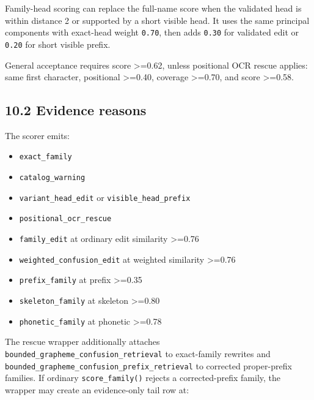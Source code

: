 Family-head scoring can replace the full-name score when the validated head is within distance 2 or supported by a short visible head. It uses the same principal components with exact-head weight \texttt{0.70}, then adds \texttt{0.30} for validated edit or \texttt{0.20} for short visible prefix.

General acceptance requires score \textgreater=0.62, unless positional OCR rescue applies: same first character, positional \textgreater=0.40, coverage \textgreater=0.70, and score \textgreater=0.58.

\subsection{10.2 Evidence reasons}\label{102-evidence-reasons}

The scorer emits:

\begin{itemize}
\tightlist
\item
  \texttt{exact\_\allowbreak{}family}
\item
  \texttt{catalog\_\allowbreak{}warning}
\item
  \texttt{variant\_\allowbreak{}head\_\allowbreak{}edit} or \texttt{visible\_\allowbreak{}head\_\allowbreak{}prefix}
\item
  \texttt{positional\_\allowbreak{}ocr\_\allowbreak{}rescue}
\item
  \texttt{family\_\allowbreak{}edit} at ordinary edit similarity \textgreater=0.76
\item
  \texttt{weighted\_\allowbreak{}confusion\_\allowbreak{}edit} at weighted similarity \textgreater=0.76
\item
  \texttt{prefix\_\allowbreak{}family} at prefix \textgreater=0.35
\item
  \texttt{skeleton\_\allowbreak{}family} at skeleton \textgreater=0.80
\item
  \texttt{phonetic\_\allowbreak{}family} at phonetic \textgreater=0.78
\end{itemize}

The rescue wrapper additionally attaches \texttt{bounded\_\allowbreak{}grapheme\_\allowbreak{}confusion\_\allowbreak{}retrieval} to exact-family rewrites and \texttt{bounded\_\allowbreak{}grapheme\_\allowbreak{}confusion\_\allowbreak{}prefix\_\allowbreak{}retrieval} to corrected proper-prefix families. If ordinary \texttt{score\_\allowbreak{}family()} rejects a corrected-prefix family, the wrapper may create an evidence-only tail row at:

